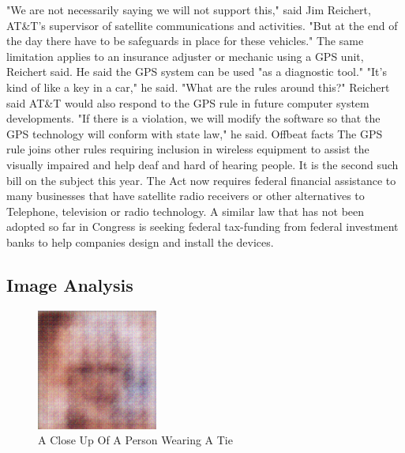 \documentclass{article}%
\begin{document}
"We are not necessarily saying we will not support this," said Jim Reichert, AT\&T's supervisor of satellite communications and activities. "But at the end of the day there have to be safeguards in place for these vehicles."\newline%
The same limitation applies to an insurance adjuster or mechanic using a GPS unit, Reichert said. He said the GPS system can be used "as a diagnostic tool."\newline%
"It's kind of like a key in a car," he said. "What are the rules around this?"\newline%
Reichert said AT\&T would also respond to the GPS rule in future computer system developments.\newline%
"If there is a violation, we will modify the software so that the GPS technology will conform with state law," he said.\newline%
Offbeat facts\newline%
The GPS rule joins other rules requiring inclusion in wireless equipment to assist the visually impaired and help deaf and hard of hearing people.\newline%
It is the second such bill on the subject this year. The\newline%
Act now requires federal financial assistance to many businesses that have satellite radio receivers or other alternatives to\newline%
Telephone, television or radio technology.\newline%
A similar law that has not been adopted so far in Congress is\newline%
seeking federal tax{-}funding from federal investment banks to help companies design and install the\newline%
devices.

%
\subsection{Image Analysis}%
\label{subsec:ImageAnalysis}%


\begin{figure}[h!]%
\centering%
\includegraphics[width=150px]{500_fake_images/samples_5_455.png}%
\caption{A Close Up Of A Person Wearing A Tie}%
\end{figure}

%
\end{document}
